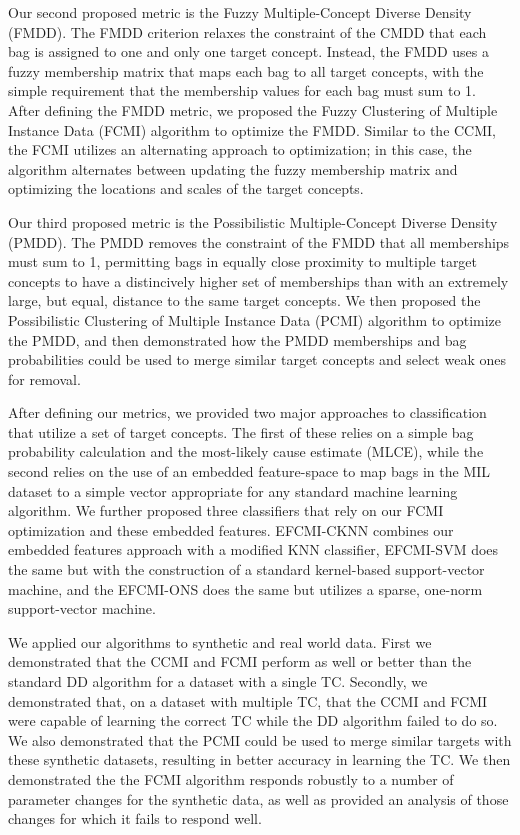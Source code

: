 \documentclass[12pt,dvips]{report}
\numberwithin{equation}{section}
\begin{document}
Our second proposed metric is the Fuzzy Multiple-Concept Diverse Density  (FMDD).  The FMDD criterion relaxes the constraint of the CMDD that each bag is assigned to one and only one target concept.  Instead, the FMDD uses a fuzzy membership matrix that maps each bag to all target concepts, with the simple requirement that the membership values for each bag must sum to 1.  After defining the FMDD metric, we proposed the Fuzzy Clustering of Multiple Instance Data (FCMI) algorithm to optimize the FMDD.  Similar to the CCMI, the FCMI utilizes an alternating approach to optimization; in this case, the algorithm alternates between updating the fuzzy membership matrix and optimizing the locations and scales of the target concepts.

Our third proposed metric is the Possibilistic Multiple-Concept Diverse Density (PMDD).  The PMDD removes the constraint of the FMDD that all memberships must sum to 1, permitting bags in equally close proximity to multiple target concepts to have a distincively higher set of memberships than with an extremely large, but equal, distance to the same target concepts.  We then proposed the Possibilistic Clustering of Multiple Instance Data (PCMI) algorithm to optimize the PMDD, and then demonstrated how the PMDD memberships and bag probabilities could be used to merge similar target concepts and select weak ones for removal.

After defining our metrics, we provided two major approaches to classification that utilize a set of target concepts.  The first of these relies on a simple bag probability calculation and the most-likely cause estimate (MLCE), while the second relies on the use of an embedded feature-space to map bags in the MIL dataset to a simple vector appropriate for any standard machine learning algorithm.  We further proposed three classifiers that rely on our FCMI optimization and these embedded features.  EFCMI-CKNN combines our embedded features approach with a modified KNN classifier, EFCMI-SVM does the same but with the construction of a standard kernel-based support-vector machine, and the EFCMI-ONS does the same but utilizes a sparse, one-norm support-vector machine.

We applied our algorithms to synthetic and real world data.  First we demonstrated that the CCMI and FCMI perform as well or better than the standard DD algorithm for a dataset with a single TC.  Secondly, we demonstrated that, on a dataset with multiple TC, that the CCMI and FCMI were capable of learning the correct TC while the DD algorithm failed to do so.  We also demonstrated that the PCMI could be used to merge similar targets with these synthetic datasets, resulting in better accuracy in learning the TC.  We then demonstrated the the FCMI algorithm responds robustly to a number of parameter changes for the synthetic data, as well as provided an analysis of those changes for which it fails to respond well.
\end{document}
